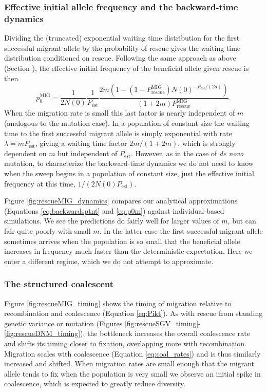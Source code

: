 \documentclass[]{article}
\begin{document}
\subsubsection*{Effective initial allele frequency and the backward-time dynamics}

Dividing the (truncated) exponential waiting time distribution for the first successful migrant allele by the probability of rescue gives the waiting time distribution conditioned on rescue.
Following the same approach as above (Section ), the effective initial frequency of the beneficial allele given rescue is then
\begin{equation}\label{eq:p0m}
p_0^\mathrm{MIG} = \frac{1}{2N(0)}\frac{1}{P_\mathrm{est}}\frac{2m \left( 1 - (1-P_\mathrm{rescue}^\mathrm{MIG})  N(0)^{-P_\mathrm{est}/(2d)} \right)}{(1+2m)P_\mathrm{rescue}^\mathrm{MIG}}.
\end{equation}
When the migration rate is small this last factor is nearly independent of $m$ (analogous to the mutation case).
In a population of constant size the waiting time to the first successful migrant allele is simply exponential with rate $\lambda = m P_\mathrm{est}$, giving a waiting time factor $2m/(1+2m)$, which is strongly dependent on $m$ but independent of $P_\mathrm{est}$.
However, as in the case of \textit{de novo} mutation, to characterize the backward-time dynamics we do not need to know when the sweep begins in a population of constant size, just the effective initial frequency at this time, $1/(2N(0)P_\mathrm{est})$.

Figure \ref{fig:rescueMIG_dynamics} compares our analytical approximations (Equations \ref{eq:backwardsptnt} and \ref{eq:p0m}) against individual-based simulations.
We see the predictions do fairly well for larger values of $m$, but can fair quite poorly with small $m$.
In the latter case the first successful migrant allele sometimes arrives when the population is so small that the beneficial allele increases in frequency much faster than the deterministic expectation.
Here we enter a different regime, which we do not attempt to approximate.

\subsubsection*{The structured coalescent}

Figure \ref{fig:rescueMIG_timing} shows the timing of migration relative to recombination and coalescence (Equation \ref{eq:Pikt}).
As with rescue from standing genetic variance or mutation (Figures \ref{fig:rescueSGV_timing}-\ref{fig:rescueDNM_timing}), the bottleneck increases the overall coalescence rate and shifts its timing closer to fixation, overlapping more with recombination. 
Migration scales with coalescence (Equation \ref{eq:coal_rates}) and is thus similarly increased and shifted.
When migration rates are small enough that the migrant allele tends to fix when the population is very small we observe an initial spike in coalescence, which is expected to greatly reduce diversity.
\end{document}
